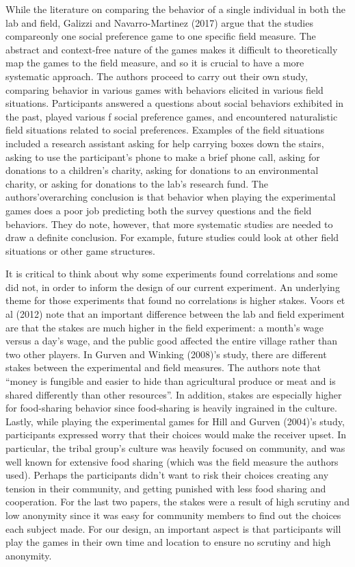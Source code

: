 \documentclass{article}
\begin{document}
 
While the literature on comparing the behavior of a single individual in both the lab and field, Galizzi and Navarro-Martinez (2017) argue that the studies compareonly one social preference game to one specific field measure. The abstract and context-free nature of the games makes it difficult to theoretically map the games to the field measure, and so it is crucial to have a more systematic approach. The authors proceed to carry out their own study, comparing behavior in various games with behaviors elicited in various field situations. Participants answered a questions about social behaviors exhibited in the past, played various f social preference games, and encountered naturalistic field situations related to social preferences. Examples of the field situations included a research assistant asking for help carrying boxes down the stairs, asking to use the participant\rq s phone to make a brief phone call, asking for donations to a children\rq s charity, asking for donations to an environmental charity, or asking for donations to the lab\rq s research fund. The authors\rq  overarching conclusion is that behavior when playing the experimental games does a poor job predicting both the survey questions and the field behaviors. They do note, however, that more systematic studies are needed to draw a definite conclusion. For example, future studies could look at other field situations or other game structures. 

It is critical to think about why some experiments found correlations and some did not, in order to inform the design of our current experiment. An underlying theme for those experiments that found no correlations is higher stakes. Voors et al (2012) note that an important difference between the lab and field experiment are that the stakes are much higher in the field experiment: a month\rq s wage versus a day\rq s wage, and the public good affected the entire village rather than two other players. In Gurven and Winking (2008)\rq s study, there are different stakes between the experimental and field measures. The authors note that ``money is fungible and easier to hide than agricultural produce or meat and is shared differently than other resources''. In addition, stakes are especially higher for food-sharing behavior since food-sharing is heavily ingrained in the culture. Lastly, while playing the experimental games for Hill and Gurven (2004)\rq s study, participants expressed worry that their choices would make the receiver upset. In particular, the tribal group\rq s culture was heavily focused on community, and was well known for extensive food sharing (which was the field measure the authors used). Perhaps the participants didn\rq t want to risk their choices creating any tension in their community, and getting punished with less food sharing and cooperation. For the last two papers, the stakes were a result of high scrutiny and low anonymity since it was easy for community members to find out the choices each subject made. For our design, an important aspect is that participants will play the games in their own time and location to ensure no scrutiny and high anonymity. 
\end{document}
